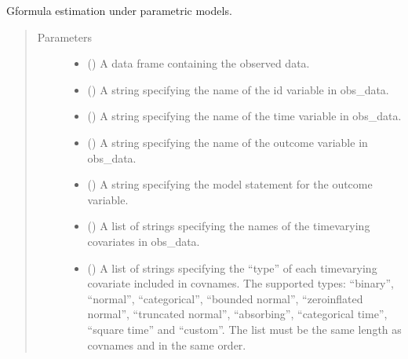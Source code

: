 \documentclass[letterpaper,10pt,english]{sphinxmanual}
\begin{document}
\begin{fulllineitems}
\sphinxAtStartPar
G\sphinxhyphen{}formula estimation under parametric models.
\begin{quote}\begin{description}
\item[{Parameters}] \leavevmode\begin{itemize}
\item {} 
\sphinxAtStartPar
{} () \textendash{} A data frame containing the observed data.

\item {} 
\sphinxAtStartPar
{} () \textendash{} A string specifying the name of the id variable in obs\_data.

\item {} 
\sphinxAtStartPar
{} () \textendash{} A string specifying the name of the time variable in obs\_data.

\item {} 
\sphinxAtStartPar
{} () \textendash{} A string specifying the name of the outcome variable in obs\_data.

\item {} 
\sphinxAtStartPar
{} () \textendash{} A string specifying the model statement for the outcome variable.

\item {} 
\sphinxAtStartPar
{} (\sphinxstyleliteralemphasis{\sphinxupquote{, }}) \textendash{} A list of strings specifying the names of the time\sphinxhyphen{}varying covariates in obs\_data.

\item {} 
\sphinxAtStartPar
{} (\sphinxstyleliteralemphasis{\sphinxupquote{, }}) \textendash{} A list of strings specifying the “type” of each time\sphinxhyphen{}varying covariate included in covnames.
The supported types: “binary”, “normal”, “categorical”, “bounded normal”, “zero\sphinxhyphen{}inflated normal”,
“truncated normal”, “absorbing”, “categorical time”, “square time” and “custom”. The list must be the same
length as covnames and in the same order.


\end{itemize}
\end{description}
\end{quote}
\end{fulllineitems}
\end{document}
